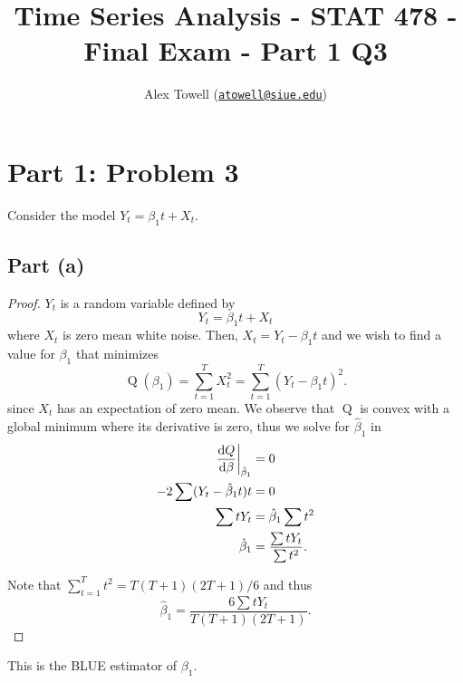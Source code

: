 \documentclass[
]{article}
\title{Time Series Analysis - STAT 478 - Final Exam - Part 1 Q3}
\author{Alex Towell
(\href{mailto:atowell@siue.edu}{\nolinkurl{atowell@siue.edu}})}
\date{}
\begin{document}
\maketitle

\hypertarget{part-1-problem-3}{%
\section{Part 1: Problem 3}\label{part-1-problem-3}}

Consider the model \(Y_t = β_1 t + X_t\).

\hypertarget{part-a}{%
\subsection{Part (a)}\label{part-a}}


\begin{proof}
$Y_t$ is a random variable defined by
$$
  Y_t = β_1 t + X_t
$$
where $X_t$ is zero mean white noise.
Then, $X_t = Y_t - β_1 t$ and we wish to find a value for $β_1$ that minimizes
$$
  \operatorname{Q}(β_1) = \sum_{t=1}^{T} X_t^2 = \sum_{t=1}^{T}(Y_t - β_1 t)^2.
$$
since $X_t$ has an expectation of zero mean.
We observe that $\operatorname{Q}$ is convex with a global minimum where its
derivative is zero, thus we solve for $\hat\beta_1$ in
\begin{align*}
  \left. \frac{\mathrm{d}Q}{\mathrm{d}\beta} \right\vert_{\hat\beta_1} &= 0\\
                          -2 \sum (Y_t - \hat\beta_1 t) t &= 0\\
                                               \sum t Y_t &= \hat\beta_1 \sum t^2\\
                                              \hat\beta_1 &= \frac{ \sum t Y_t }{\sum t^2}.
\end{align*}

Note that $\sum_{t=1}^{T} t^2 = T(T+1)(2 T+1)/6$ and thus
\begin{equation}
  \hat\beta_1 = \frac{ 6 \sum t Y_t }{T(T+1)(2 T+1)}.
\end{equation}
\end{proof}

This is the BLUE estimator of \(\beta_1\).
\end{document}
